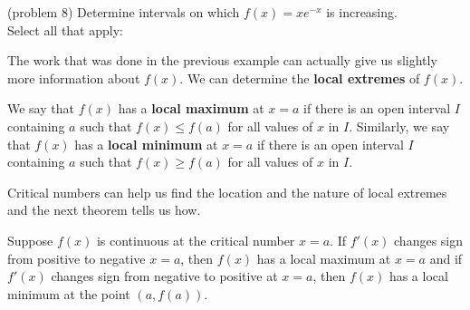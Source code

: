 \documentclass[handout]{ximera}
\begin{document}
\begin{problem}(problem 8)
Determine intervals on which $f(x) = xe^{-x}$ is increasing.\\
Select all that apply:
\begin{selectAll}
\end{selectAll}

\end{problem}



The work that was done in the previous example can actually give us slightly more 
information about $f(x)$.  
We can determine the \textbf{local extremes} of $f(x)$.

\begin{definition}
We say that $f(x)$ has a \textbf{local maximum} at $x = a$ if there is an open 
interval $I$ containing $a$ 
such that $f(x) \leq f(a)$ for all values of $x$ in $I$.  Similarly, we say that $f(x)$ has a 
\textbf{local minimum} at $x = a$ if there is an open interval $I$ containing $a$ 
such that $f(x) \geq f(a)$ for all values of $x$ in $I$.
\end{definition}

Critical numbers can help us find the location and the nature of local 
extremes and the next theorem tells us how.

\begin{theorem}[First Derivative Test]
Suppose $f(x)$ is continuous at the critical number $x=a$.
If $f'(x)$ changes sign from positive to negative $x=a$,
 then  $f(x)$ has a local maximum at $x = a$ and
 if $f'(x)$ changes sign from negative to positive at $x=a$,
 then $f(x)$ has a local minimum at the point $(a, f(a))$.
\end{theorem}
 
\end{document}
